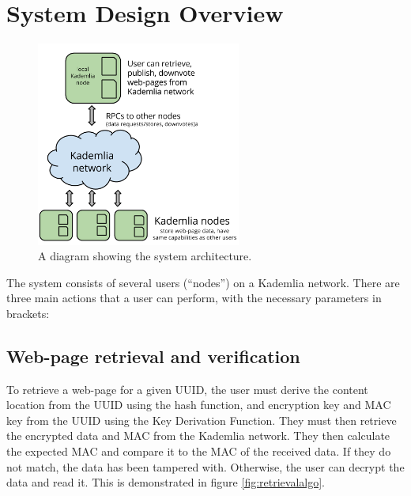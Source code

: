 \section{System Design Overview}

\begin{figure}[H]
    \centering
    \includegraphics[width=0.6\textwidth]{img/arch.png}
    \caption{A diagram showing the system architecture.}
    \label{fig:arch}
\end{figure}

The system consists of several users (``nodes'') on a Kademlia network. There are three main actions that a user can perform,
with the necessary parameters in brackets:

\subsection{Web-page retrieval and verification}

To retrieve a web-page for a given UUID, the user must derive the content location from the UUID using the hash function,
and encryption key and MAC key from the UUID using the Key Derivation Function. They must then retrieve the encrypted data
and MAC from the Kademlia network. They then calculate the expected MAC and compare it to the MAC of the received data. If
they do not match, the data has been tampered with. Otherwise, the user can decrypt the data and read it. This is demonstrated in
figure \ref{fig:retrievalalgo}.

